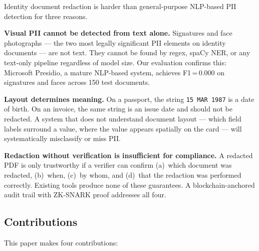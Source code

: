 Identity document redaction is harder than general-purpose
NLP-based PII detection for three reasons.

\textbf{Visual PII cannot be detected from text alone.}
Signatures and face photographs --- the two most legally
significant PII elements on identity documents --- are
not text.
They cannot be found by regex, spaCy NER, or any
text-only pipeline regardless of model size.
Our evaluation confirms this: Microsoft Presidio, a
mature NLP-based system, achieves F1\,=\,0.000 on
signatures and faces across 150 test documents.

\textbf{Layout determines meaning.}
On a passport, the string \texttt{15\,MAR\,1987} is a
date of birth.
On an invoice, the same string is an issue date and
should not be redacted.
A system that does not understand document layout ---
which field labels surround a value, where the value
appears spatially on the card --- will systematically
misclassify or miss PII.

\textbf{Redaction without verification is insufficient
for compliance.}
A redacted PDF is only trustworthy if a verifier can
confirm (a)~which document was redacted, (b)~when,
(c)~by whom, and (d)~that the redaction was performed
correctly.
Existing tools produce none of these guarantees.
A blockchain-anchored audit trail with ZK-SNARK proof
addresses all four.

\subsection*{Contributions}

This paper makes four contributions:

